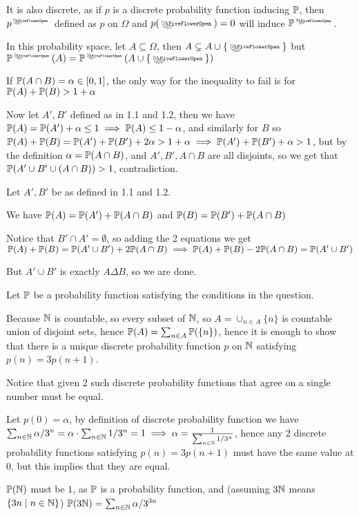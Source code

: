 \begin{cExercise}
\begin{cPart}
		It is also discrete, as if $p$ is a discrete probability function inducing $\P$, then $p^{\flower}$ defined as $p$ on $\Omega$ and $p(\flower)=0$ will induce $\P^{\flower}$.
		
		In this probability space, let $A\subseteq\Omega$, then $A\subsetneq A\cup\{\flower\}$ but $\P^{\flower}(A)=\P^{\flower}(A\cup\{\flower\})$
	\end{cPart}
	\begin{cPart}
		If $\P(A\cap B)=\alpha\in[0,1]$, the only way for the inequality to fail is for $\P(A)+\P(B)>1+\alpha$
		
		Now let $A',B'$ defined as in 1.1 and 1.2, then we have $\P(A)=\P(A')+\alpha\le 1\implies \P(A)\le 1-\alpha$, and similarly for $B$ so $\P(A)+\P(B)=\P(A')+\P(B')+2\alpha>1+\alpha\implies \P(A')+\P(B')+\alpha>1$, but by the definition $\alpha=\P(A\cap B)$, and $A',B',A\cap B$ are all disjoints, so we get that $\P(A'\cup B'\cup (A\cap B))>1$, contradiction.
		
	\end{cPart}
	\begin{cPart}
		Let $A',B'$ be as defined in 1.1 and 1.2.
		
		We have $\P(A)=\P(A')+\P(A\cap B)$ and $\P(B)=\P(B')+\P(A\cap B)$
		
		Notice that $B'\cap A'=\emptyset$, so adding the 2 equations we get $\P(A)+\P(B)=\P(A'\cup B')+2\P(A\cap B)\implies \P(A)+\P(B)-2\P(A\cap B)=\P(A'\cup B')$
		
		But $A'\cup B'$ is exactly $A\Delta B$, so we are done.
	\end{cPart}
\end{cExercise}
\begin{cExercise}
	Let $\P$ be a probability function satisfying the conditions in the question.
	
	Because $\N$ is countable, so every subset of $\N$, so $A=\cup_{n\in A}\{n\}$ is countable union of disjoint sets, hence $\P(A)=\sum_{n\in A}\P(\{n\})$, hence it is enough to show that there is a unique discrete probability function $p$ on $\N$ satisfying $p(n)=3p(n+1)$.
	
	Notice that given 2 such discrete probability functions that agree on a single number must be equal.
	
	Let $p(0)=\alpha$, by definition of discrete probability function we have $\sum_{n\in\N}\alpha/3^n=\alpha\cdot \sum_{n\in\N}1/3^n=1\implies \alpha=\frac1{\sum_{n\in\N}1/3^n}$, hence any 2 discrete probability functions satisfying $p(n)=3p(n+1)$ must have the same value at $0$, but this implies that they are equal.
	
	$\P(\N)$ must be $1$, as $\P$ is a probability function, and (assuming $3\N$ means $\{3n\mid n\in\N\}$) $\P(3\N)=\sum_{n\in\N}\alpha/3^{3n}$
\end{cExercise}








